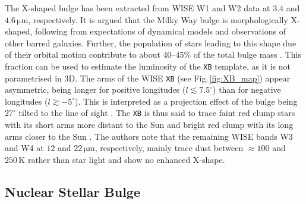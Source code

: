 \documentclass[doublespace,draft,nopageskip]{VTthesis} %
\newcommand{\mrm}[1]{\mathrm{#1}}
\begin{document}
\begin{appendices}
	The X-shaped bulge \citep[\texttt{XB},][]{Ness2016_Xbulge_WISE} has been extracted from WISE W1 and W2 data at $3.4$ and $4.6\,\mrm{\mu m}$, respectively.
	It is argued that the Milky Way bulge is morphologically X-shaped, following from expectations of dynamical models and observations of other barred galaxies.
	Further, the population of stars leading to this shape due of their orbital motion contribute to about 40--45\% of the total bulge mass \citep{Portail2015_MilkyWayorbots_Xbulge}.
	This fraction can be used to estimate the luminosity of the \texttt{XB} template, as it is not parametrised in 3D.
	The arms of the WISE \texttt{XB} (see Fig.\,\ref{fig:XB_map}) appear asymmetric, being longer for positive longitudes ($l \lesssim 7.5^{\circ}$) than for negative longitudes ($l \gtrsim -5^{\circ}$).
	This is interpreted as a projection effect of the bulge being $27^{\circ}$ tilted to the line of sight \citep{Wegg2013_bulgebar}.
	The \texttt{XB} is thus said to trace faint red clump stars with its short arms more distant to the Sun and bright red clump with its long arms closer to the Sun \cite[][cf. discussion about the `double red clump' of the Milky Way]{Lee2018_DoubleRedClump}.
	The authors note that the remaining WISE bands W3 and W4 at $12$ and $22\,\mrm{\mu m}$, respectively, mainly trace dust between $\approx 100$ and $250\,\mrm{K}$ rather than star light and show no enhanced X-shape.
	
	
	\subsection{Nuclear Stellar Bulge}
	

\end{appendices}
\end{document}
